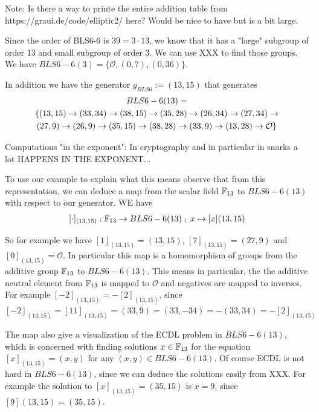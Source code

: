 Note: Is there a way to printe the entire addition table from https://graui.de/code/elliptic2/ here? Would be nice to have but is a bit large.

Since the order of BLS6-6 is $39= 3\cdot 13$, we know that it has a "large" subgroup of order $13$ and small subgroup of order $3$. We can use XXX to find those groups. We have $BLS6-6(3)=\{\mathcal{O},(0,7),(0,36)\}$.

In addition we have the generator $g_{BLS6}:=(13,15)$ that generates
\begin{multline}
BLS6-6(13)=\\
\{(13,15) \rightarrow (33,34) \rightarrow  (38,15) \rightarrow  (35,28) \rightarrow (26,34) \rightarrow  (27,34) \rightarrow  \\ 
(27,9)  \rightarrow  (26,9) \rightarrow  (35,15) \rightarrow  (38,28) \rightarrow  (33,9) \rightarrow (13,28) \rightarrow  \mathcal{O}\}$$
\end{multline}

Computations "in the exponent": In cryptography and in particular in snarks a lot HAPPENS IN THE EXPONENT...

To use our example to explain what this means observe that from this representation, we can deduce a map from the scalar field $\mathbb{F}_{13}$ to $BLS6-6(13)$ with respect to our generator. WE have
$$
[\cdot]_{(13,15)}: \mathbb{F}_{13} \to BLS6-6(13)\;;\; x \mapsto [x](13,15)
$$

So for example we have $[1]_{(13,15)}= (13,15)$, $[7]_{(13,15)}= (27,9)$ and $[0]_{(13,15)}= \mathcal{O}$. In particular this map is a homomorphism of groups from the additive group $\mathbb{F}_{13}$ to $BLS6-6(13)$. This means in particular, the the additive neutral element from $\mathbb{F}_{13}$ is mapped to $\mathcal{O}$ and negatives are mapped to inverses. For example $[-2]_{(13,15)}= - [2]_{(13,15)}$, since
$[-2]_{(13,15)}= [11]_{(13,15)}= (33,9) = (33,-34) = -(33,34)=
- [2]_{(13,15)}$

The map also give a visualization of the ECDL problem in $BLS6-6(13)$, which is concerned with finding solutions $x\in \mathbb{F}_{13}$ for the equation 
$[x]_{(13,15)}= (x,y)$ for any $(x,y) \in BLS6-6(13)$. Of course ECDL is not hard in $BLS6-6(13)$, since we can deduce the solutions easily from XXX. For example the solution to $[x]_{(13,15)}= (35,15)$ is $x=9$, since $[9](13,15)=(35,15)$.

